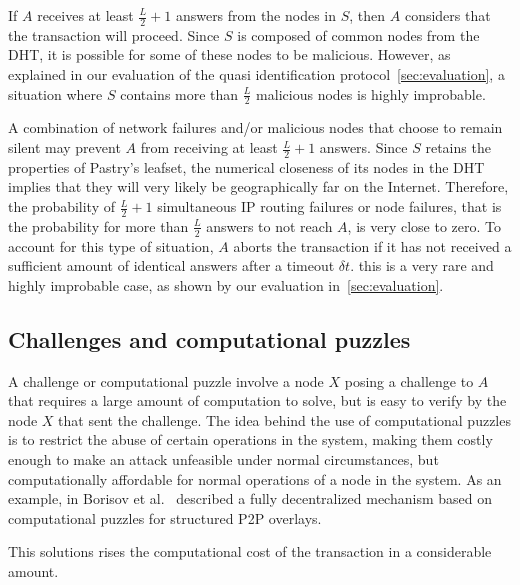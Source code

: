 If $A$ receives at least $\frac{L}{2} + 1$ answers from the nodes in $S$, then
$A$ considers that the transaction will proceed. Since $S$ is composed of
common nodes from the DHT, it is possible for some of these nodes to be
malicious. However, as explained in our evaluation of the quasi identification
protocol~\ref{sec:evaluation}, a situation where $S$ contains more than
$\frac{L}{2}$ malicious nodes is highly improbable.

A combination of network failures and/or malicious nodes that choose to remain
silent may prevent $A$ from receiving at least $\frac{L}{2} + 1$ answers. Since
$S$ retains the properties of Pastry's leafset, the numerical closeness of its
nodes in the DHT implies that they will very likely be geographically far on
the Internet. Therefore, the probability of $\frac{L}{2} + 1 $ simultaneous IP
routing failures or node failures, that is the probability for more than
$\frac{L}{2}$ answers to not reach $A$, is very close to zero. To account for
this type of situation, $A$ aborts the transaction if it has not received a
sufficient amount of identical answers after a timeout $\delta t$. this is a
very rare and highly improbable case, as shown by our evaluation
in~\ref{sec:evaluation}.


\subsection{Challenges and computational puzzles}
\label{sec:challenges_puzzles}
A challenge or computational puzzle involve a node $X$ posing a challenge to
$A$ that requires a large amount of computation to solve, but is easy to verify
by the node $X$ that sent the challenge. The idea behind the use of
computational puzzles is to restrict the abuse of certain operations in the
system, making them costly enough to make an attack unfeasible under normal
circumstances, but computationally affordable for normal operations of a node
in the system. As an example, in Borisov et al.~\cite{borisov2006computational} described a
fully decentralized mechanism based on computational puzzles for structured P2P
overlays.


This solutions rises the computational cost of the transaction in a
considerable amount.



